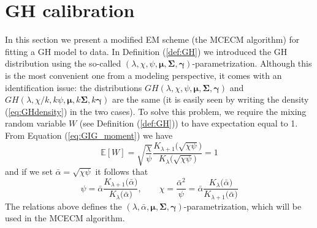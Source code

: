\section{GH calibration} \label{sec:GH_calibration}
In this section we present a modified \gls{EM} scheme (the \gls{MCECM} algorithm) for fitting a \gls{GH} model to data. In Definition (\ref{def:GH}) we introduced the GH distribution using the so-called $(\lambda,\chi,\psi,\bm{\mu},\bm{\Sigma},\bm{\gamma})$-parametrization. Although this is the most convenient one from a modeling perspective, it comes with an identification issue: the distributions $GH(\lambda,\chi,\psi,\bm{\mu},\bm{\Sigma},\bm{\gamma})$ and $GH(\lambda,\chi /k,k\psi,\bm{\mu},k\bm{\Sigma},k\bm{\gamma})$ are the same (it is easily seen by writing the density (\ref{eq:GHdensity}) in the two cases). To solve this problem, we require the mixing random variable $W$ (see Definition (\ref{def:GH})) to have expectation equal to 1. From Equation (\ref{eq:GIG_moment}) we have 
\[ \mathbb{E}[W]=\sqrt{\dfrac{\chi}{\psi}}\frac{K_{\lambda+1}\big(\sqrt{\chi\psi}\big)}{K_{\lambda}\big(\sqrt{\chi\psi}\big)} = 1  \] 
and if we set $\bar{\alpha} = \sqrt{\chi\psi}$ it follows that 
\begin{equation}\label{eq:PsiChi_function_alpha}
\psi=\bar{\alpha}\frac{K_{\lambda+1}\big(\bar{\alpha}\big)}{K_{\lambda}\big(\bar{\alpha}\big)}, \qquad \chi = \frac{\bar{\alpha}^2}{\psi} = \bar{\alpha}\frac{K_{\lambda}\big(\bar{\alpha}\big)}{K_{\lambda+1}\big(\bar{\alpha}\big)}
\end{equation}
The relations above defines the $(\lambda,\bar{\alpha},\bm{\mu},\bm{\Sigma},\bm{\gamma})$-parametrization, which will be used in the MCECM algorithm.

